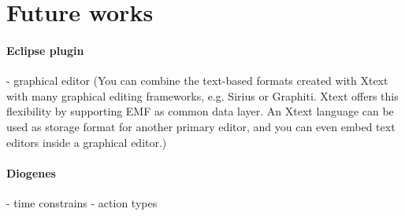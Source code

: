 \section{Future works}

\paragraph{Eclipse plugin}
- graphical editor (You can combine the text-based formats created with Xtext with many graphical editing frameworks, e.g. Sirius or Graphiti. Xtext offers this flexibility by supporting EMF as common data layer. An Xtext language can be used as storage format for another primary editor, and you can even embed text editors inside a graphical editor.)

\paragraph{Diogenes}
- time constrains
- action types